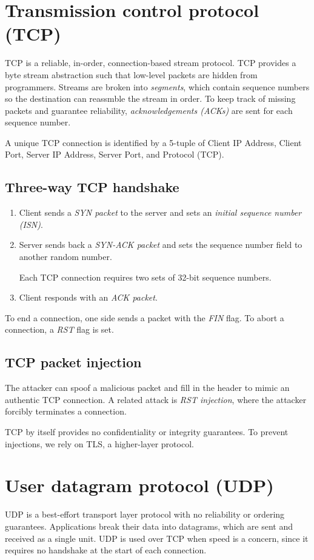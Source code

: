 \section{Transmission control protocol (TCP)}
TCP is a reliable, in-order, connection-based stream protocol. TCP provides a byte stream abstraction such that low-level packets are hidden from programmers. Streams are broken into \emph{segments}, which contain sequence numbers so the destination can reassmble the stream in order. To keep track of missing packets and guarantee reliability, \emph{acknowledgements (ACKs)} are sent for each sequence number.

\medskip
A unique TCP connection is identified by a 5-tuple of Client IP Address, Client Port, Server IP Address, Server Port, and Protocol (TCP).

\subsection{Three-way TCP handshake}
\begin{enumerate}
    \item Client sends a \emph{SYN packet} to the server and sets an \emph{initial sequence number (ISN)}.
    \item Server sends back a \emph{SYN-ACK packet} and sets the sequence number field to another random number. 
    
    Each TCP connection requires two sets of 32-bit sequence numbers.
    \item Client responds with an \emph{ACK packet}.
\end{enumerate}

To end a connection, one side sends a packet with the \emph{FIN} flag. To abort a connection, a \emph{RST} flag is set.

\subsection{TCP packet injection}
The attacker can spoof a malicious packet and fill in the header to mimic an authentic TCP connection. A related attack is \emph{RST injection}, where the attacker forcibly terminates a connection.

\medskip
TCP by itself provides no confidentiality or integrity guarantees. To prevent injections, we rely on TLS, a higher-layer protocol.

\section{User datagram protocol (UDP)}
UDP is a best-effort transport layer protocol with no reliability or ordering guarantees. Applications break their data into datagrams, which are sent and received as a single unit. UDP is used over TCP when speed is a concern, since it requires no handshake at the start of each connection.
